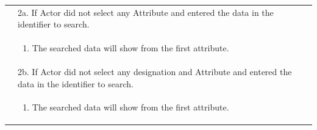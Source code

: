 \documentclass[12pt,a4paper]{report}
\begin{document}
\begin{tabular}{ | m{3cm} | m{12cm}| }
& 2a. If Actor did not select any Attribute and entered the data in the identifier to search. \\
& \begin{enumerate}
		\item The searched data will show from the first attribute.
	\end{enumerate}
\\ 
& 2b. If Actor did not select any designation and  Attribute and entered the data in the identifier to search. \\
& \begin{enumerate}
		\item The searched data will show from the first attribute.
	\end{enumerate}
\\ \hline
\end{tabular}
\end{document}
